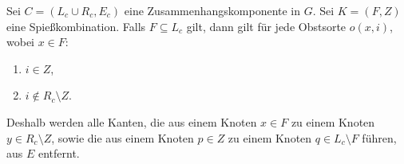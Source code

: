 \begin{korollar}\label{kor:komponente-mengen}
Sei $C = (L_c \cup R_c, E_c)$ eine Zusammenhangskomponente in $G$.
Sei $K = (F, Z)$ eine Spießkombination.
Falls $F \subseteq L_c$ gilt, dann gilt für jede Obstsorte $o(x, i)$, wobei $x \in F$:
\begin{enumerate}[label={\upshape(\roman*)}]
	\item $i \in Z$,
	\item $i \notin R_c \setminus Z$.
\end{enumerate}
Deshalb werden alle Kanten, die aus einem Knoten $x \in F$ 
zu einem Knoten $y \in R_c \setminus Z$, sowie die aus einem Knoten $p \in Z$ 
zu einem Knoten $q \in L_c \setminus F$ führen, aus $E$ entfernt.
\end{korollar}

\begin{comment}
\begin{proof}
\ref{lem:komponente-mengen1} gilt nach Defintion \ref{def:spiesskomb}, Axiom \ref{ax:obstsorte-index}
und Lemma \ref{lem:spiess-numbers}.\\
\ref{lem:komponente-mengen2} gilt aus dem Grund, dass $L_c$ und $R_c$ gleichmächtig sind.
(Sonst, könnte man nicht allen $x \in A$ einen $y \in B$ zuweisen.)
\TODO{Beweis zu Ende}
\end{proof}
\end{comment}
